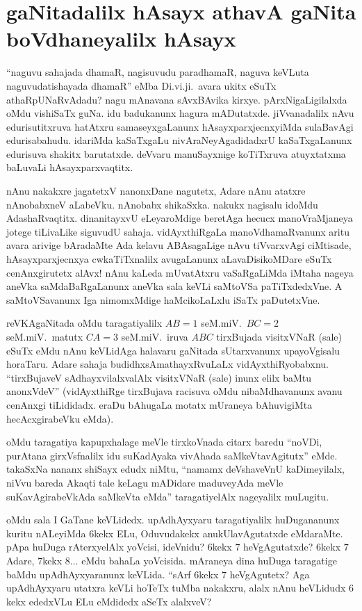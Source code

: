 \chapter{gaNitadalilx hAsayx athavA gaNita boVdhaneyalilx hAsayx}\label{chap14}

``naguvu sahajada dhamaR, nagisuvudu paradhamaR, naguva keVLuta naguvudatishayada dhamaR'' eMba Di.vi.ji.\ avara ukitx eSuTx athaRpUNaRvAdadu? nagu mAnavana sAvxBAvika kirxye. pArxNigaLigilalxda oMdu vishiSaTx guNa. idu badukanunx hagura mADutatxde. jiVvanadalilx nAvu edurisutitxruva hatAtxru samaseyxgaLanunx hAsayxparxjecnxyiMda sulaBavAgi edurisabahudu. idariMda kaSaTxgaLu nivAraNeyAgadidadxrU kaSaTxgaLanunx edurisuva shakitx barutatxde. deVvaru manuSayxnige koTiTxruva atuyxtatxma baLuvaLi hAsayxparxvaqtitx.

nAnu nakakxre jagatetxV nanonxDane nagutetx, Adare nAnu atatxre nAnobabxneV aLabeVku. nAnobabx shikaSxka. nakukx nagisalu idoMdu AdashaRvaqtitx. dinanitayxvU eLeyaroMdige beretAga hecucx manoVraMjaneya jotege tiLivaLike siguvudU sahaja. vidAyxthiRgaLa manoVdhamaRvanunx aritu avara arivige bAradaMte Ada kelavu ABAsagaLige nAvu tiVvarxvAgi ciMtisade, hAsayxparxjecnxya cwkaTiTxnalilx avugaLanunx aLavaDisikoMDare eSuTx cenAnxgirutetx alAvx! nAnu kaLeda mUvatAtxru vaSaRgaLiMda iMtaha nageya aneVka saMdaBaRgaLanunx aneVka sala keVLi saMtoVSa paTiTxdedxVne. A saMtoVSavanunx Iga nimomxMdige haMcikoLaLxlu iSaTx paDutetxVne.

reVKAgaNitada oMdu taragatiyalilx $AB=1$ seM.miV.\ $BC=2$ seM.miV.\ matutx $CA=3$ seM.miV.\ iruva $ABC$ tirxBujada visitxVNaR (sale) eSuTx eMdu nAnu keVLidAga halavaru gaNitada sUtarxvanunx upayoVgisalu horaTaru. Adare sahaja budidhxsAmathayxRvuLaLx vidAyxthiRyobabxnu. ``tirxBujaveV sAdhayxvilalxvalAlx visitxVNaR (sale) inunx elilx baMtu anonxVdeV'' (vidAyxthiRge tirxBujava racisuva oMdu nibaMdhavanunx avanu cenAnxgi tiLididadx. eraDu bAhugaLa motatx mUraneya bAhuvigiMta hecAcxgirabeVku eMda).

oMdu taragatiya kapupxhalage meVle tirxkoVnada citarx baredu ``noVDi, purAtana girxVsfnalilx idu suKadAyaka vivAhada saMkeVtavAgitutx'' eMde. takaSxNa nananx shiSayx edudx niMtu, ``namamx deVshaveVnU kaDimeyilalx, niVvu bareda Akaqti tale keLagu mADidare maduveyAda meVle suKavAgirabeVkAda saMkeVta eMda'' taragatiyelAlx nageyalilx muLugitu.

oMdu sala I GaTane keVLidedx. upAdhAyxyaru taragatiyalilx huDugananunx kuritu nALeyiMda $6$kekx ELu, Oduvudakekx anukUlavAgutatxde eMdaraMte. pApa huDuga rAterxyelAlx yoVcisi, ideVnidu? $6$kekx $7$ heVgAgutatxde? $6$kekx $7$ Adare, $7$kekx $8\ldots$ eMdu bahaLa yoVcisida. mAraneya dina huDuga taragatige baMdu upAdhAyxyaranunx keVLida. ``sArf $6$kekx $7$ heVgAgutetx? Aga upAdhAyxyaru utatxra keVLi hoTeTx tuMba nakakxru, alalx nAnu heVLidudx $6$kekx ededxVLu  ELu eMdidedx aSeTx alalxveV?

